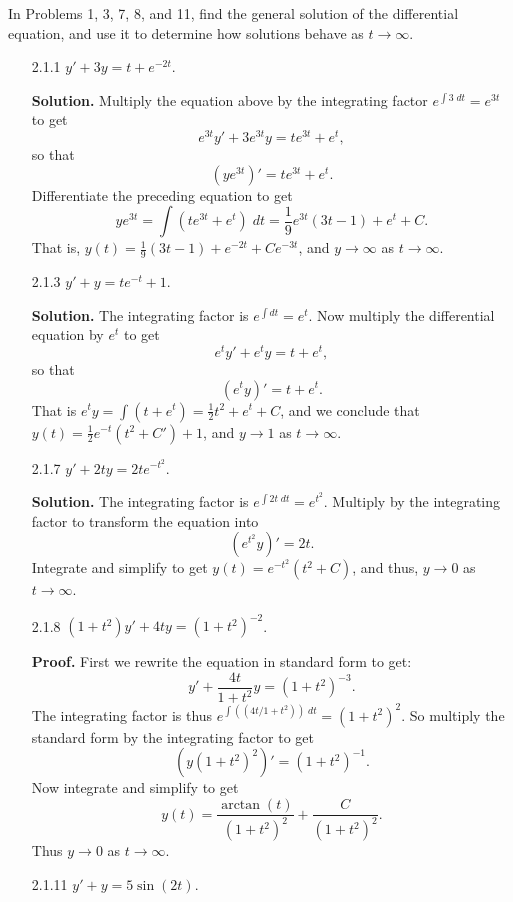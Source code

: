 In Problems 1, 3, 7, 8, and 11, find the general solution of the differential
equation, and use it to determine how solutions behave as
$t \rightarrow \infty$.
\begin{enumerate}
   \item[2.1.1]   $y' + 3y = t + e^{-2t}$.

      \textbf{Solution.} Multiply the equation above by the integrating factor
      $e^{\int 3\;dt} = e^{3t}$ to get
      $$e^{3t}y' + 3e^{3t}y = te^{3t} + e^t,$$
      so that
      $$(ye^{3t})' = te^{3t} + e^t.$$
      Differentiate the preceding equation to get
      $$ye^{3t} = \int (te^{3t} + e^t)\;dt = \frac{1}{9}e^{3t}(3t - 1) + e^t +
        C.$$
      That is, $y(t) = \frac{1}{9}(3t - 1) + e^{-2t} + Ce^{-3t}$, and
      $y \rightarrow \infty$ as $t \rightarrow \infty$.
   \item[2.1.3]   $y' + y = te^{-t} + 1$.

      \textbf{Solution.} The integrating factor is $e^{\int dt} = e^t$. Now
      multiply the differential equation by $e^t$ to get
      $$e^ty' + e^ty = t + e^t,$$
      so that
      $$(e^ty)' = t + e^t.$$
      That is $e^ty = \int(t + e^t) = \frac{1}{2}t^2 + e^t + C$, and we conclude
      that $y(t) = \frac{1}{2}e^{-t}(t^2 + C') + 1$, and $y \rightarrow 1$ as
      $t \rightarrow \infty$.
   \item[2.1.7]   $y' + 2ty = 2te^{-t^2}$.

      \textbf{Solution.} The integrating factor is
      $e^{\int 2t\;dt} = e^{t^2}$. Multiply by the integrating factor
      to transform the equation into
      $$(e^{t^2}y)' = 2t.$$
      Integrate and simplify to get $y(t) = e^{-t^2}(t^2 + C)$, and thus,
      $y \rightarrow 0$ as $t \rightarrow \infty$.
   \item[2.1.8]   $(1 + t^2)y' + 4ty = (1 + t^2)^{-2}$.

      \textbf{Proof.} First we rewrite the equation in standard form to get:
      $$y' + \frac{4t}{1+t^2}y = (1 + t^2)^{-3}.$$
      The integrating factor is thus $e^{\int((4t/1+t^2))\;dt} = (1 + t^2)^2$.
      So multiply the standard form by the integrating factor to get
      $$(y(1+t^2)^2)' = (1+t^2)^{-1}.$$
      Now integrate and simplify to get
      $$y(t) = \frac{\arctan(t)}{(1+t^2)^2} + \frac{C}{(1+t^2)^2}.$$
      Thus $y \rightarrow 0$ as $t \rightarrow \infty$.
   \item[2.1.11]  $y' + y = 5\sin(2t)$.
\end{enumerate}

